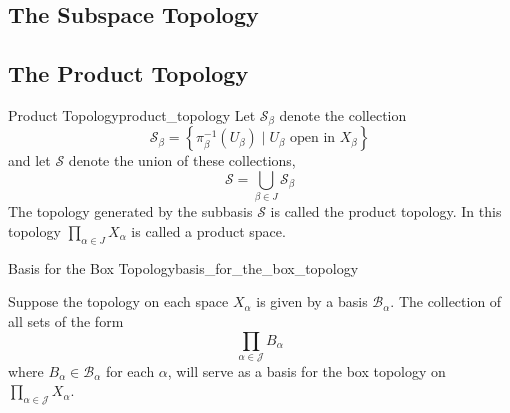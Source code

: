 















\subsection{The Subspace Topology}



\subsection{The Product Topology}


\begin{definition}{Product Topology}{product_topology}
    Let $\mathcal{S}_{\beta}$ denote the collection
    \[
    \mathcal{ S } _{\beta}=\left\{\pi_{\beta}^{-1}\left(U_{\beta}\right) \mid U_{\beta} \text { open in } X_{\beta}\right\}
    \]
    and let $\mathcal{ S } $ denote the union of these collections,
    \[
    \mathcal{S}=\bigcup_{\beta \in J} \mathcal{S}_{\beta}
    \]
    The topology generated by the subbasis $\mathcal{ S } $ is called the product topology. In this topology $\prod_{\alpha \in J} X_{\alpha}$ is called a product space.
\end{definition}




\begin{theorem}{Basis for the Box Topology}{basis_for_the_box_topology}

Suppose the topology on each space $X_{\alpha}$ is given by a basis $\mathcal{B}_{\alpha}$. The collection of all sets of the form
\[
\prod_{\alpha \in \mathcal{ J } } B_{\alpha}
\]
where $B_{\alpha} \in \mathcal{B}_{\alpha}$ for each $\alpha$, will serve as a basis for the box topology on $\prod_{\alpha \in \mathcal{ J } } X_{\alpha}$.
\end{theorem}

